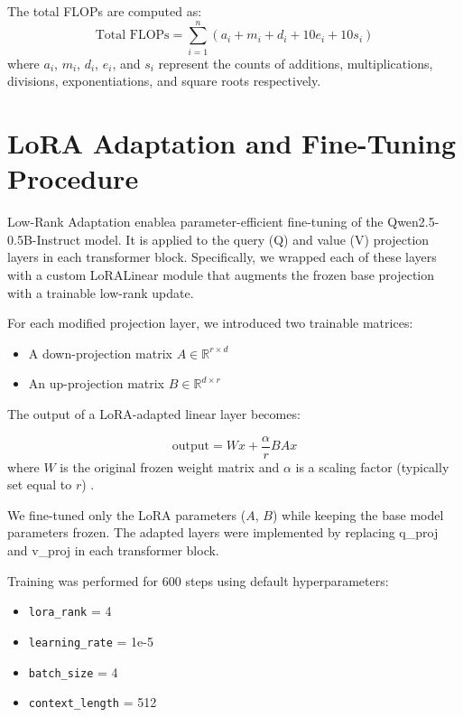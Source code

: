 \documentclass[a4paper,12pt]{article}
\begin{document}
The total FLOPs are computed as:
\begin{equation}
\text{Total FLOPs} = \sum_{i=1}^{n} \left( a_i + m_i + d_i + 10e_i + 10s_i \right)
\end{equation}
where $a_i$, $m_i$, $d_i$, $e_i$, and $s_i$ represent the counts of additions, multiplications, divisions, exponentiations, and square roots respectively.

\section{LoRA Adaptation and Fine-Tuning Procedure}

Low-Rank Adaptation enablea parameter-efficient fine-tuning of the Qwen2.5-0.5B-Instruct model. It is applied to the query (Q) and value (V) projection layers in each transformer block. Specifically, we wrapped each of these layers with a custom LoRALinear module that augments the frozen base projection with a trainable low-rank update.

For each modified projection layer, we introduced two trainable matrices:
\begin{itemize}
    \item A down-projection matrix $A \in \mathbb{R}^{r \times d}$
    \item An up-projection matrix $B \in \mathbb{R}^{d \times r}$
\end{itemize}

The output of a LoRA-adapted linear layer becomes:

\begin{equation}
\text{output} = W x + \frac{\alpha}{r} B A x
\end{equation}
where $W$ is the original frozen weight matrix and $\alpha$ is a scaling factor (typically set equal to $r$) \citep{hu2021lora}.

We fine-tuned only the LoRA parameters ($A$, $B$) while keeping the base model parameters frozen. The adapted layers were implemented by replacing q\_proj and v\_proj in each transformer block.

Training was performed for 600 steps using default hyperparameters:
\begin{itemize}
    \item \texttt{lora\_rank} = 4
    \item \texttt{learning\_rate} = 1e-5
    \item \texttt{batch\_size} = 4
    \item \texttt{context\_length} = 512
\end{itemize}
\end{document}
